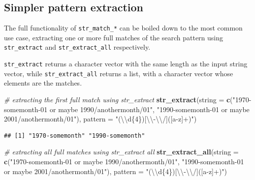 \documentclass[]{book}
\newenvironment{Shaded}{}{}
\newcommand{\CharTok}[1]{\textcolor[rgb]{0.25,0.44,0.63}{#1}}
\newcommand{\CommentTok}[1]{\textcolor[rgb]{0.38,0.63,0.69}{\textit{#1}}}
\newcommand{\DataTypeTok}[1]{\textcolor[rgb]{0.56,0.13,0.00}{#1}}
\newcommand{\KeywordTok}[1]{\textcolor[rgb]{0.00,0.44,0.13}{\textbf{#1}}}
\newcommand{\NormalTok}[1]{#1}
\newcommand{\StringTok}[1]{\textcolor[rgb]{0.25,0.44,0.63}{#1}}
\begin{document}
\hypertarget{simpler-pattern-extraction}{%
\subsection{Simpler pattern extraction}\label{simpler-pattern-extraction}}

The full functionality of \texttt{str\_match\_*} can be boiled down to the most common use case, extracting one or more full matches of the search pattern using \texttt{str\_extract} and \texttt{str\_extract\_all} respectively.

\texttt{str\_extract} returns a character vector with the same length as the input string vector, while \texttt{str\_extract\_all} returns a list, with a character vector whose elements are the matches.

\begin{Shaded}
\begin{Highlighting}[]
\CommentTok{# extracting the first full match using str_extract}
\KeywordTok{str_extract}\NormalTok{(}\DataTypeTok{string =} \KeywordTok{c}\NormalTok{(}\StringTok{"1970-somemonth-01 or maybe 1990/anothermonth/01"}\NormalTok{,}
                       \StringTok{"1990-somemonth-01 or maybe 2001/anothermonth/01"}\NormalTok{),}
          \DataTypeTok{pattern =} \StringTok{"(}\CharTok{\textbackslash{}\textbackslash{}}\StringTok{d\{4\})[}\CharTok{\textbackslash{}\textbackslash{}}\StringTok{-}\CharTok{\textbackslash{}\textbackslash{}}\StringTok{/]([a-z]+)"}\NormalTok{)}
\end{Highlighting}
\end{Shaded}

\begin{verbatim}
## [1] "1970-somemonth" "1990-somemonth"
\end{verbatim}

\begin{Shaded}
\begin{Highlighting}[]
\CommentTok{# extracting all full matches using str_extract all}
\KeywordTok{str_extract_all}\NormalTok{(}\DataTypeTok{string =} \KeywordTok{c}\NormalTok{(}\StringTok{"1970-somemonth-01 or maybe 1990/anothermonth/01"}\NormalTok{,}
                       \StringTok{"1990-somemonth-01 or maybe 2001/anothermonth/01"}\NormalTok{),}
          \DataTypeTok{pattern =} \StringTok{"(}\CharTok{\textbackslash{}\textbackslash{}}\StringTok{d\{4\})[}\CharTok{\textbackslash{}\textbackslash{}}\StringTok{-}\CharTok{\textbackslash{}\textbackslash{}}\StringTok{/]([a-z]+)"}\NormalTok{)}
\end{Highlighting}
\end{Shaded}
\end{document}

